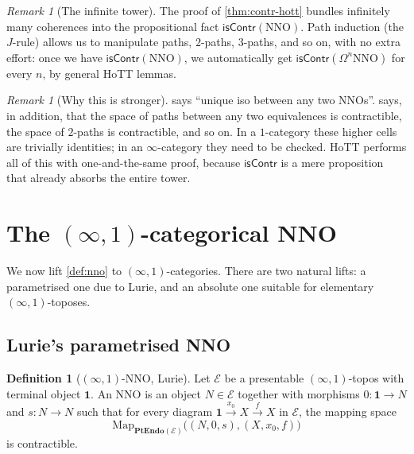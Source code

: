 \documentclass[12pt]{article}
\theoremstyle{definition}
\newtheorem{definition}[theorem]{Definition}
\theoremstyle{remark}
\newtheorem{remark}[theorem]{Remark}
\newcommand{\Map}{\mathrm{Map}}
\newcommand{\PtEndo}{\mathbf{PtEndo}}
\newcommand{\NNO}{\mathrm{NNO}}
\newcommand{\isContr}{\mathsf{isContr}}
\begin{document}
\begin{remark}[The infinite tower]
The proof of \cref{thm:contr-hott} bundles infinitely many coherences into the propositional fact $\isContr(\NNO)$. Path induction (the $J$-rule) allows us to manipulate paths, $2$-paths, $3$-paths, and so on, with no extra effort: once we have $\isContr(\NNO)$, we automatically get $\isContr(\Omega^{n}\NNO)$ for every $n$, by general HoTT lemmas.
\end{remark}

\begin{remark}[Why this is stronger]
 says ``unique iso between any two NNOs''.  says, in addition, that the space of paths between any two equivalences is contractible, the space of $2$-paths is contractible, and so on. In a $1$-category these higher cells are trivially identities; in an $\infty$-category they need to be checked. HoTT performs all of this with one-and-the-same proof, because $\isContr$ is a mere proposition that already absorbs the entire tower.
\end{remark}

\section{The \texorpdfstring{$(\infty,1)$}{(infinity,1)}-categorical NNO}\label{sec:lurie}

We now lift \cref{def:nno} to $(\infty,1)$-categories. There are two natural lifts: a parametrised one due to Lurie, and an absolute one suitable for elementary $(\infty,1)$-toposes.

\subsection{Lurie's parametrised NNO}

\begin{definition}[$(\infty,1)$-NNO, Lurie]\label{def:lurie-nno}
Let $\mathcal{E}$ be a presentable $(\infty,1)$-topos with terminal object $\mathbf{1}$. An NNO is an object $N\in\mathcal{E}$ together with morphisms $0\colon \mathbf{1}\to N$ and $s\colon N\to N$ such that for every diagram $\mathbf{1}\xrightarrow{x_{0}}X\xrightarrow{f}X$ in $\mathcal{E}$, the mapping space
\[
\Map_{\PtEndo(\mathcal{E})}\bigl((N,0,s),(X,x_{0},f)\bigr)
\]
is contractible.
\end{definition}
\end{document}
